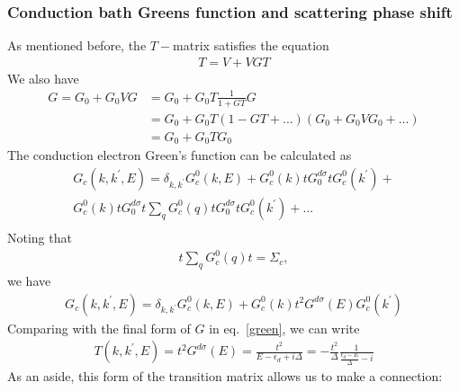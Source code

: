 \subsubsection{Conduction bath Greens function and scattering phase shift}
As mentioned before, the \(T-\)matrix satisfies the equation
\begin{equation}\begin{aligned}
T = V + VGT 
\end{aligned}\end{equation}
We also have
\begin{equation}\begin{aligned}
G = G_0 + G_0VG &= G_0 + G_0 T \frac{1}{1+GT}G \\
		&= G_0 + G_0T(1-GT+...)(G_0+G_0VG_0+...)\\
        &= G_0 + G_0 T G_0 \label{green}
\end{aligned}\end{equation}
The conduction electron Green's function can be calculated as
\begin{equation}\begin{aligned}
G_c(k,k^\prime,E) = \delta_{k,k^\prime}G^0_c(k,E) + G_c^0(k)t G_0^{d\sigma} t G^0_c(k^\prime) + \\ G_c^0(k)t G_0^{d\sigma} t \sum_q G_c^0(q) t G_0^{d\sigma} t G^0_c(k^\prime) + ...\\
\end{aligned}\end{equation}
Noting that 
\begin{equation}\begin{aligned}
t\sum_q G_c^0(q)t = \Sigma_c,
\end{aligned}\end{equation}
we have
\begin{equation}\begin{aligned}
	G_c(k,k^\prime,E) = \delta_{k,k^\prime}G^0_c(k,E) + G_c^0(k)t^2 G^{d\sigma}(E)G_c^0(k^\prime)
\end{aligned}\end{equation}
Comparing with the final form of \(G\) in eq.~\ref{green}, we can write
\begin{equation}\begin{aligned}
	\label{tm}
	T(k,k^\prime,E) = t^2 G^{d\sigma}(E) = \frac{t^2}{E-\epsilon_d + i\Delta}=-\frac{t^2}{\Delta} \frac{1}{\frac{ \epsilon_d- E}{\Delta}-i}
\end{aligned}\end{equation}
As an aside, this form of the transition matrix allows us to make a connection:
